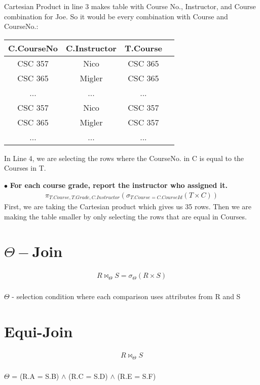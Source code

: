 \documentclass[twoside]{article}
\begin{document}
Cartesian Product in line 3 makes table with Course No., Instructor, and Course
combination for Joe. So it would be every combination with Course and CourseNo.:
\begin{table}[H]
    \centering
    \begin{tabular}{c|c|c|c}
        C.CourseNo & C.Instructor & T.Course \\
        \hline
        CSC 357 & Nico & CSC 365 \\
        CSC 365 & Migler & CSC 365 \\
        ... & ... & ... \\
        CSC 357 & Nico & CSC 357 \\
        CSC 365 & Migler & CSC 357 \\
        ... & ... & ... \\
    \end{tabular}
\end{table}

In Line 4, we are selecting the rows where the CourseNo. in C is equal to the
Courses in T. 

$\bullet$ \textbf{For each course grade, report the instructor who assigned it.}
\begin{gather*}
    \pi_{T.Course, T.Grade, C.Instructor}(\sigma_{T.Course=C.CourseId}(T 
    \times C))
\end{gather*}
First, we are taking the Cartesian product which gives us 35 rows. Then we are
making the table smaller by only selecting the rows that are equal in Courses.

\section*{$\Theta-$Join}
\begin{gather*}
    R \bowtie_{\Theta} S = \sigma_{\Theta}(R \times S) \\
\end{gather*}
\begin{center}
    $\Theta$ - selection condition where each comparison uses attributes from 
    R and S
\end{center}

\section*{Equi-Join}
\begin{gather*}
    R \bowtie_{\Theta} S \\
\end{gather*}
\begin{center}
    $\Theta$ = (R.A = S.B) $\wedge$ (R.C = S.D) $\wedge$ (R.E = S.F) \\
\end{center}
\end{document}
